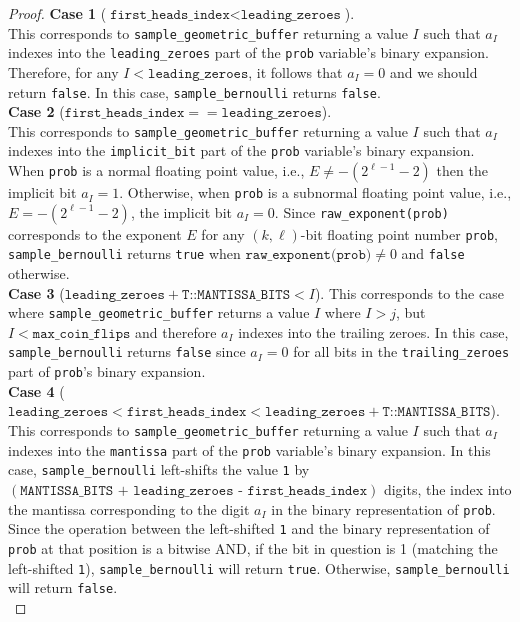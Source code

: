 \documentclass[11pt,a4paper]{article}
\theoremstyle{definition}
\begin{document}
\begin{proof}
\noindent\textbf{Case 1} ($\texttt{first\_heads\_index} < \texttt{leading\_zeroes}$). \\
\noindent This corresponds to \texttt{sample\_geometric\_buffer} returning a value $I$ such that $a_I$ indexes into the \texttt{leading\_zeroes} part of the  \texttt{prob} variable's binary expansion. Therefore, for any $I < \texttt{leading\_zeroes}$, it follows that $a_I = 0$ and we should return \texttt{false}. In this case, \texttt{sample\_bernoulli} returns \texttt{false}.\\

\noindent\textbf{Case 2} ($\texttt{first\_heads\_index} == \texttt{leading\_zeroes}$). \\
\noindent This corresponds to \texttt{sample\_geometric\_buffer} returning a value $I$ such that $a_I$ indexes into the \texttt{implicit\_bit} part of the  \texttt{prob} variable's binary expansion. When \texttt{prob} is a normal floating point value, i.e., $E \ne -(2^{\ell -1} - 2)$ then the implicit bit $a_I = 1$. Otherwise, when \texttt{prob} is a subnormal floating point value, i.e., $E = -(2^{\ell - 1} - 2)$, the implicit bit $a_I = 0$. Since \texttt{raw\_exponent(prob)} corresponds to the exponent $E$ for any $(k,\ell)$-bit floating point number \texttt{prob}, \texttt{sample\_bernoulli} returns \texttt{true} when $\texttt{raw\_exponent(prob)} \ne 0$ and \texttt{false} otherwise. \\


\noindent\textbf{Case 3} ($\texttt{leading\_zeroes}  + \texttt{T::MANTISSA\_BITS} < I$). This corresponds to the case where  \texttt{sample\_geometric\_buffer} returns a value $I$ where $I > j$, but $I < \texttt{max\_coin\_flips}$ and therefore $a_I$ indexes into the trailing zeroes. In this case, \texttt{sample\_bernoulli} returns \texttt{false} since $a_I = 0$ for all bits in the \texttt{trailing\_zeroes} part of \texttt{prob}'s binary expansion. \\

\noindent\textbf{Case 4} ($ \texttt{leading\_zeroes} < \texttt{first\_heads\_index}  <  \texttt{leading\_zeroes}  + \texttt{T::MANTISSA\_BITS}$). \\
\noindent This corresponds to \texttt{sample\_geometric\_buffer} returning a value $I$ such that $a_I$ indexes into the \texttt{mantissa} part of the  \texttt{prob} variable's binary expansion. In this case, 
\texttt{sample\_bernoulli}  left-shifts the value \texttt{1} by  $(\texttt{MANTISSA\_BITS + leading\_zeroes - first\_heads\_index})$ digits, the index into the mantissa corresponding to the digit $a_I$ in the binary representation of \texttt{prob}. Since the operation between the left-shifted \texttt{1} and the binary representation of \texttt{prob} at that position is a bitwise AND, if the bit in question is 1 (matching the left-shifted \texttt{1}), \texttt{sample\_bernoulli} will return \texttt{true}. Otherwise, \texttt{sample\_bernoulli} will return \texttt{false}. \\



\end{proof}
\end{document}
